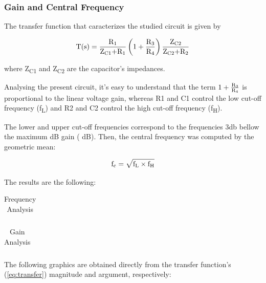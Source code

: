 \subsubsection{Gain and Central Frequency}
 
The transfer function that caracterizes the studied circuit is given by

\begin{equation} \label{eq:transfer}
 \text{T(s)}=\frac{\text{R\textsubscript1}}{\text{Z\textsubscript{C1}+R\textsubscript1}} \left( 1+\frac{\text{R\textsubscript3}}{\text{R\textsubscript4}}\right) \frac{\text{Z\textsubscript{C2}}}{\text{Z\textsubscript{C2}+R\textsubscript2}}
\end{equation}

where Z\textsubscript{C1} and Z\textsubscript{C2} are the capacitor's impedances.

Analysing the present circuit, it's easy to understand that the term $ 1+\frac{\text{R\textsubscript3}}{\text{R\textsubscript4}}$ is proportional to the linear voltage gain, whereas R1 and C1 control the low cut-off frequency (f\textsubscript{L}) and R2 and C2 control the high cut-off frequency (f\textsubscript{H}).

The lower and upper cut-off frequencies correspond to the frequencies 3db bellow the maximum dB gain ( dB). Then, the central frequency was computed by the geometric mean:

\begin{equation}
 \text{f\textsubscript{c}}= \sqrt{\text{f\textsubscript{L}} \times \text{f\textsubscript{H}}}
\end{equation}

The results are the following:

\begin{table}[!htb]
\centering
  \begin{tabular}{|c | c|}
    \hline    
    
 \end{tabular}
 \caption{Frequency Analysis}\label{tab:theo:frequencies}
\end{table}


\begin{table}[!htb]
\centering
  \begin{tabular}{|c | c|}
    \hline    
    
 \end{tabular}
 \caption{Gain Analysis}\label{tab:theo:gain}
\end{table}

The following graphics are obtained directly from the transfer function's (\ref{eq:transfer}) magnitude and argument, respectively:



